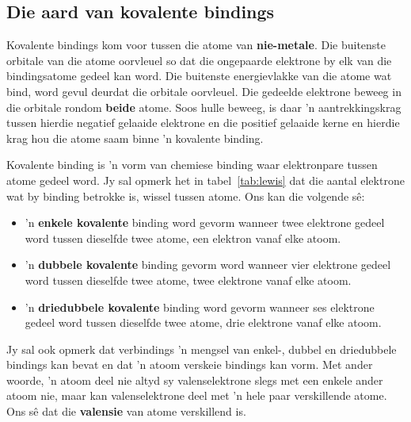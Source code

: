             \subsection*{Die aard van kovalente bindings}
            \nopagebreak
        \label{m38704*id138956}
Kovalente bindings kom voor tussen die atome van \textbf{nie-metale}. Die buitenste orbitale van die atome oorvleuel so dat die ongepaarde elektrone by elk van die bindingsatome gedeel kan word. Die buitenste energievlakke van die atome wat bind, word gevul deurdat die orbitale oorvleuel. Die gedeelde elektrone beweeg in die orbitale rondom \textbf{beide} atome. Soos hulle beweeg, is daar 'n aantrekkingskrag tussen hierdie negatief gelaaide elektrone en die positief gelaaide kerne en hierdie krag hou die atome saam binne 'n kovalente binding.\par 


\label{m38704*fhsst!!!underscore!!!id94}
 {Kovalente binding is 'n vorm van chemiese binding waar elektronpare tussen atome gedeel word.} 
\label{m38704*id139505}Jy sal opmerk het in tabel~\ref{tab:lewis} dat die aantal elektrone wat by binding betrokke is, wissel tussen atome. Ons kan die volgende s\^{e}:
\begin{itemize}
 \item 'n \textbf{enkele kovalente} binding word gevorm wanneer twee elektrone gedeel word tussen dieselfde twee atome, een elektron vanaf elke atoom. 
 \item 'n \textbf{dubbele kovalente} binding gevorm word wanneer vier elektrone gedeel word tussen dieselfde twee atome, twee elektrone vanaf elke atoom.
 \item 'n \textbf{driedubbele kovalente} binding word gevorm wanneer ses elektrone gedeel word tussen dieselfde twee atome, drie elektrone vanaf elke atoom.
\end{itemize}
Jy sal ook opmerk dat verbindings 'n mengsel van enkel-, dubbel en driedubbele bindings kan bevat en dat 'n atoom verskeie bindings kan vorm. Met ander woorde, 'n atoom deel nie altyd sy valenselektrone slegs met een enkele ander atoom nie, maar kan valenselektrone deel met  'n hele paar verskillende atome.\\
Ons s\^{e} dat die \textbf{valensie} van atome verskillend is. 

